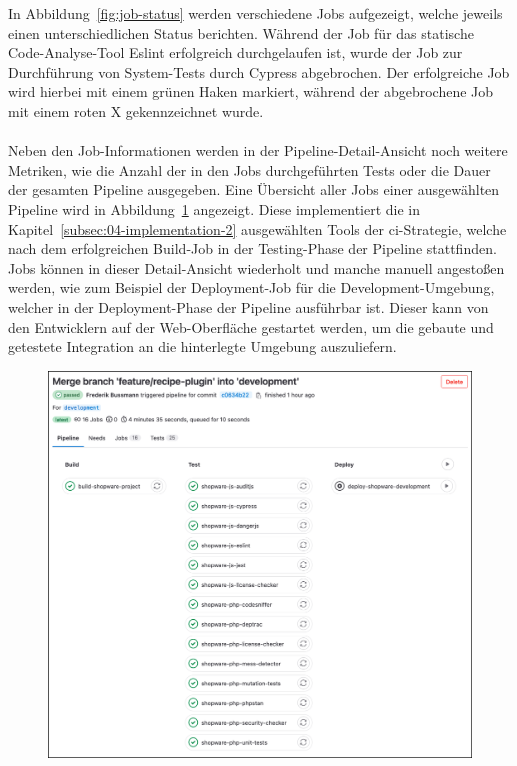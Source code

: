 In Abbildung\ \ref{fig:job-status} werden verschiedene Jobs aufgezeigt, welche jeweils einen unterschiedlichen Status
berichten.
Während der Job für das statische Code-Analyse-Tool Eslint erfolgreich durchgelaufen ist, wurde der Job zur
Durchführung von System-Tests durch Cypress abgebrochen.
Der erfolgreiche Job wird hierbei mit einem grünen Haken markiert, während der abgebrochene Job mit einem roten X
gekennzeichnet wurde.
\\\\
Neben den Job-Informationen werden in der Pipeline-Detail-Ansicht noch weitere Metriken, wie die Anzahl der in den Jobs
durchgeführten Tests oder die Dauer der gesamten Pipeline ausgegeben.
Eine Übersicht aller Jobs einer ausgewählten Pipeline wird in Abbildung\ \ref{fig:job-overview} angezeigt.
Diese implementiert die in Kapitel\ \ref{subsec:04-implementation-2} ausgewählten Tools der \acrshort{ci}-Strategie,
welche nach dem erfolgreichen Build-Job in der Testing-Phase der Pipeline stattfinden.
Jobs können in dieser Detail-Ansicht wiederholt und manche manuell angestoßen werden, wie zum Beispiel der
Deployment-Job für die Development-Umgebung, welcher in der Deployment-Phase der Pipeline ausführbar ist.
Dieser kann von den Entwicklern auf der Web-Oberfläche gestartet werden, um die gebaute und getestete Integration an die
hinterlegte Umgebung auszuliefern.

\begin{figure}[H]
    \centering
    \includegraphics[width=\textwidth]{images/content/job-overview}
    \label{fig:job-overview}
\end{figure}
